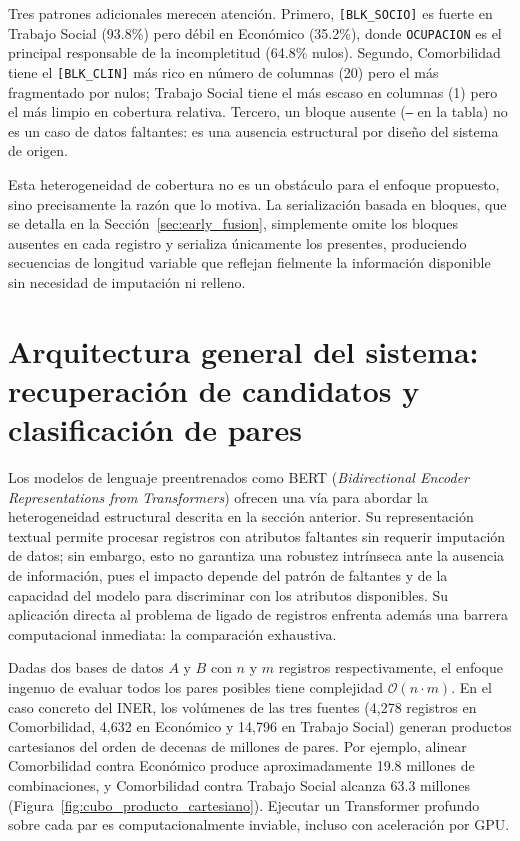 Tres patrones adicionales merecen atención. Primero, \texttt{[BLK\_SOCIO]} es fuerte en Trabajo Social (93.8\%) pero débil en Económico (35.2\%), donde \texttt{OCUPACION} es el principal responsable de la incompletitud (64.8\% nulos). Segundo, Comorbilidad tiene el \texttt{[BLK\_CLIN]} más rico en número de columnas (20) pero el más fragmentado por nulos; Trabajo Social tiene el más escaso en columnas (1) pero el más limpio en cobertura relativa. Tercero, un bloque ausente (\texttt{---} en la tabla) no es un caso de datos faltantes: es una ausencia estructural por diseño del sistema de origen.

Esta heterogeneidad de cobertura no es un obstáculo para el enfoque propuesto, sino precisamente la razón que lo motiva. La serialización basada en bloques, que se detalla en la Sección~\ref{sec:early_fusion}, simplemente omite los bloques ausentes en cada registro y serializa únicamente los presentes, produciendo secuencias de longitud variable que reflejan fielmente la información disponible sin necesidad de imputación ni relleno.


\section{Arquitectura general del sistema: recuperación de candidatos y clasificación de pares}

Los modelos de lenguaje preentrenados como BERT (\textit{Bidirectional Encoder Representations from Transformers}) ofrecen una vía para abordar la heterogeneidad estructural descrita en la sección anterior. Su representación textual permite procesar registros con atributos faltantes sin requerir imputación de datos; sin embargo, esto no garantiza una robustez intrínseca ante la ausencia de información, pues el impacto depende del patrón de faltantes y de la capacidad del modelo para discriminar con los atributos disponibles. Su aplicación directa al problema de ligado de registros enfrenta además una barrera computacional inmediata: la comparación exhaustiva.

Dadas dos bases de datos $A$ y $B$ con $n$ y $m$ registros respectivamente, el enfoque ingenuo de evaluar todos los pares posibles tiene complejidad $\mathcal{O}(n \cdot m)$. En el caso concreto del INER, los volúmenes de las tres fuentes (4,278 registros en Comorbilidad, 4,632 en Económico y 14,796 en Trabajo Social) generan productos cartesianos del orden de decenas de millones de pares. Por ejemplo, alinear Comorbilidad contra Económico produce aproximadamente 19.8 millones de combinaciones, y Comorbilidad contra Trabajo Social alcanza 63.3 millones (Figura~\ref{fig:cubo_producto_cartesiano}). Ejecutar un Transformer profundo sobre cada par es computacionalmente inviable, incluso con aceleración por GPU.

